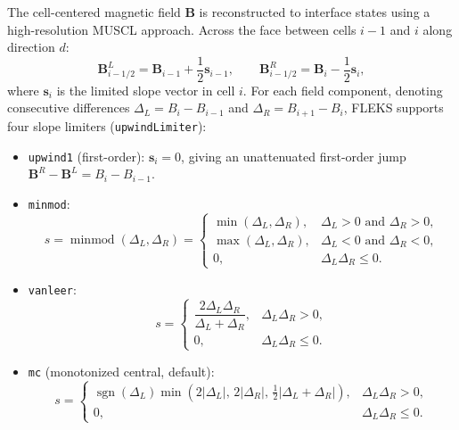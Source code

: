 \documentclass[a4paper, 11pt]{article}
\begin{document}
The cell-centered magnetic field $\mathbf{B}$ is reconstructed to interface states using a high-resolution MUSCL approach. Across the face between cells $i-1$ and $i$ along direction $d$:
\begin{equation}
\mathbf{B}^L_{i-1/2} = \mathbf{B}_{i-1} + \frac{1}{2}\mathbf{s}_{i-1}, \qquad \mathbf{B}^R_{i-1/2} = \mathbf{B}_i - \frac{1}{2}\mathbf{s}_i,
\end{equation}
where $\mathbf{s}_i$ is the limited slope vector in cell $i$. For each field component, denoting consecutive differences $\Delta_L = B_i - B_{i-1}$ and $\Delta_R = B_{i+1} - B_i$, FLEKS supports four slope limiters (\texttt{upwindLimiter}):
\begin{itemize}
  \item \texttt{upwind1} (first-order): $\mathbf{s}_i = 0$, giving an unattenuated first-order jump $\mathbf{B}^R - \mathbf{B}^L = B_i - B_{i-1}$.
  \item \texttt{minmod}:
  \begin{equation}
  s = \operatorname{minmod}(\Delta_L, \Delta_R) = \begin{cases}
  \min(\Delta_L, \Delta_R), & \Delta_L > 0 \text{ and } \Delta_R > 0, \\
  \max(\Delta_L, \Delta_R), & \Delta_L < 0 \text{ and } \Delta_R < 0, \\
  0, & \Delta_L \Delta_R \le 0.
  \end{cases}
  \end{equation}
  \item \texttt{vanleer}:
  \begin{equation}
  s = \begin{cases}
  \dfrac{2\Delta_L \Delta_R}{\Delta_L + \Delta_R}, & \Delta_L \Delta_R > 0, \\
  0, & \Delta_L \Delta_R \le 0.
  \end{cases}
  \end{equation}
  \item \texttt{mc} (monotonized central, default):
  \begin{equation}
  s = \begin{cases}
  \operatorname{sgn}(\Delta_L)\min\left(2|\Delta_L|,\, 2|\Delta_R|,\, \frac{1}{2}|\Delta_L + \Delta_R|\right), & \Delta_L \Delta_R > 0, \\
  0, & \Delta_L \Delta_R \le 0.
  \end{cases}
  \end{equation}
\end{itemize}
\end{document}
